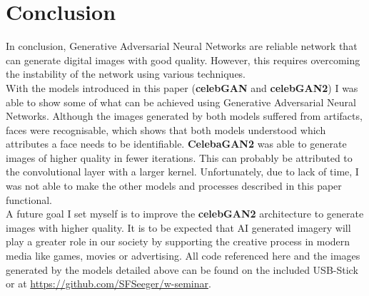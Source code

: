 \documentclass{article}
\begin{document}
\section{Conclusion}
In conclusion, Generative Adversarial Neural Networks are reliable network that can generate digital images with good quality. However, this requires overcoming the instability of the network using various techniques.\\
With the models introduced in this paper (\textbf{celebGAN} and \textbf{celebGAN2}) I was able to show some of what can be achieved using Generative Adversarial Neural Networks. Although the images generated by both models suffered from artifacts, faces were recognisable, which shows that both models understood which attributes a face needs to be identifiable. \textbf{CelebaGAN2} was able to generate images of higher quality in fewer iterations. This can probably be attributed to the convolutional layer with a larger kernel. Unfortunately, due to lack of time, I was not able to make the other models and processes described in this paper functional. \\
A future goal I set myself is to improve the \textbf{celebGAN2} architecture to generate images with higher quality. It is to be expected that AI generated imagery will play a greater role in our society by supporting the creative process in modern media like games, movies or advertising. 
All code referenced here and the images generated by the models detailed above can be found on the included USB-Stick or at \url{https://github.com/SFSeeger/w-seminar}.

\clearpage\printbibliography
\clearpage\printglossary[toctitle=Glossary]


\end{document}
